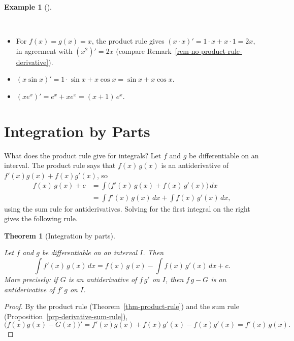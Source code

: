 \documentclass[
  letterpaper,
  DIV=11,
  numbers=noendperiod]{scrreprt}
\providecommand{\tightlist}{%
  \setlength{\itemsep}{0pt}\setlength{\parskip}{0pt}}
\theoremstyle{plain}
\theoremstyle{plain}
\theoremstyle{definition}
\theoremstyle{definition}
\theoremstyle{definition}
\newtheorem{example}{Example}[chapter]
\theoremstyle{plain}
\newtheorem{theorem}{Theorem}[chapter]
\theoremstyle{plain}
\theoremstyle{remark}
\begin{document}
\begin{example}[]\protect\hypertarget{exm-product-rule}{}\label{exm-product-rule}

~

\begin{itemize}
\tightlist
\item
  For \(f(x)=g(x)=x\), the product rule gives
  \((x\cdot x)' = 1\cdot x + x\cdot 1 = 2x\), in agreement with
  \((x^2)'=2x\) (compare Remark~\ref{rem-no-product-rule-derivative}).
\item
  \((x\sin x)' = 1\cdot\sin x + x\cos x = \sin x + x\cos x\).
\item
  \((x e^x)' = e^x + x e^x = (x+1)\,e^x\).
\end{itemize}

\end{example}

\section{Integration by Parts}\label{integration-by-parts}

What does the product rule give for integrals? Let \(f\) and \(g\) be
differentiable on an interval. The product rule says that \(f(x)\,g(x)\)
is an antiderivative of \(f'(x)g(x)+f(x)g'(x)\), so \[
\begin{aligned}
f(x)\,g(x) + c &= \int \big(f'(x)\,g(x) + f(x)\,g'(x)\big)\,dx \\
&= \int f'(x)\,g(x)\,dx + \int f(x)\,g'(x)\,dx ,
\end{aligned}
\] using the sum rule for antiderivatives. Solving for the first
integral on the right gives the following rule.

\begin{theorem}[Integration by
parts]\protect\hypertarget{thm-integration-by-parts}{}\label{thm-integration-by-parts}

Let \(f\) and \(g\) be differentiable on an interval \(I\). Then \[
\int f'(x)\,g(x)\,dx = f(x)\,g(x) - \int f(x)\,g'(x)\,dx + c .
\] More precisely: if \(G\) is an antiderivative of \(f\,g'\) on \(I\),
then \(f\,g-G\) is an antiderivative of \(f'\,g\) on \(I\).

\end{theorem}

\begin{proof}
By the product rule (Theorem~\ref{thm-product-rule}) and the sum rule
(Proposition~\ref{prp-derivative-sum-rule}), \[
\big(f(x)g(x) - G(x)\big)' = f'(x)g(x) + f(x)g'(x) - f(x)g'(x) = f'(x)\,g(x) .
\]
\end{proof}
\end{document}
